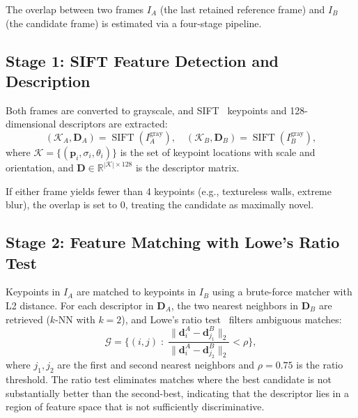 \documentclass[runningheads]{llncs}
\newcommand{\mR}{\mathbb{R}}
\newcommand{\op}[1]{\operatorname{#1}}
\newcommand{\mat}[1]{\bm{#1}}
\begin{document}
The overlap between two frames $I_A$ (the last retained reference frame) and $I_B$ (the candidate frame) is estimated via a four-stage pipeline.

\subsection{Stage 1: SIFT Feature Detection and Description}
\label{sec:sift}

Both frames are converted to grayscale, and SIFT~\cite{lowe2004distinctive} keypoints and 128-dimensional descriptors are extracted:
\begin{equation}
    (\mathcal{K}_A, \mat{D}_A) = \op{SIFT}(I_A^{\text{gray}}), \quad
    (\mathcal{K}_B, \mat{D}_B) = \op{SIFT}(I_B^{\text{gray}}),
    \label{eq:sift}
\end{equation}
where $\mathcal{K} = \{(\mat{p}_i, \sigma_i, \theta_i)\}$ is the set of keypoint locations with scale and orientation, and $\mat{D} \in \mR^{|\mathcal{K}| \times 128}$ is the descriptor matrix.

If either frame yields fewer than 4 keypoints (e.g., textureless walls, extreme blur), the overlap is set to 0, treating the candidate as maximally novel.

\subsection{Stage 2: Feature Matching with Lowe's Ratio Test}
\label{sec:matching}

Keypoints in $I_A$ are matched to keypoints in $I_B$ using a brute-force matcher with L2 distance.  For each descriptor in $\mat{D}_A$, the two nearest neighbors in $\mat{D}_B$ are retrieved ($k$-NN with $k=2$), and Lowe's ratio test~\cite{lowe2004distinctive} filters ambiguous matches:
\begin{equation}
    \mathcal{G} = \bigl\{(i, j) \;:\; \frac{\|{\mat{d}}_i^A - \mat{d}_{j_1}^B\|_2}{\|\mat{d}_i^A - \mat{d}_{j_2}^B\|_2} < \rho\bigr\},
    \label{eq:ratio_test}
\end{equation}
where $j_1, j_2$ are the first and second nearest neighbors and $\rho = 0.75$ is the ratio threshold.  The ratio test eliminates matches where the best candidate is not substantially better than the second-best, indicating that the descriptor lies in a region of feature space that is not sufficiently discriminative.
\end{document}
